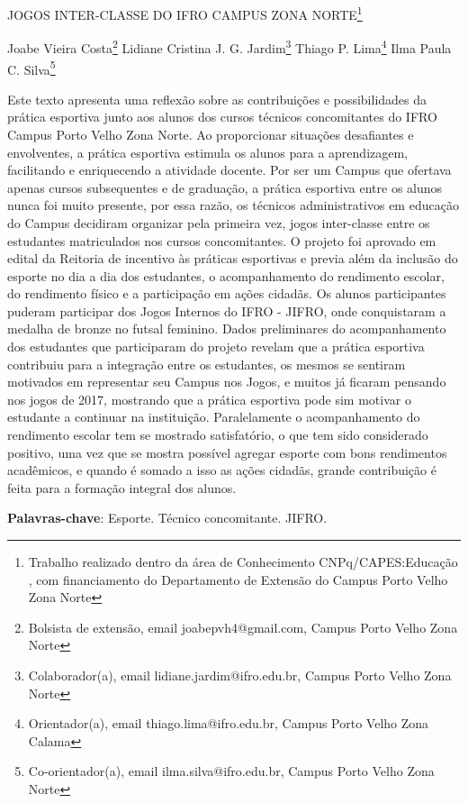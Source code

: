 \documentclass[article,12pt,onesidea,4paper,english,brazil]{abntex2}
\begin{document}
	
	
	\frenchspacing 
	
	\begin{center}
		\LARGE JOGOS INTER-CLASSE DO IFRO CAMPUS ZONA NORTE\footnote{Trabalho realizado dentro da área de Conhecimento CNPq/CAPES:Educação , com financiamento do Departamento de Extensão do Campus Porto Velho Zona Norte}
		
		\normalsize
		Joabe Vieira Costa\footnote{Bolsista de extensão, email joabepvh4@gmail.com, Campus Porto Velho Zona Norte} 
		Lidiane Cristina J. G. Jardim\footnote{Colaborador(a), email lidiane.jardim@ifro.edu.br, Campus Porto Velho Zona Norte} 
		Thiago P. Lima\footnote{Orientador(a), email thiago.lima@ifro.edu.br, Campus Porto Velho Zona Calama} 
		Ilma Paula C. Silva\footnote{Co-orientador(a), email ilma.silva@ifro.edu.br, Campus Porto Velho Zona Norte} 
	\end{center}
	
	\noindent Este texto apresenta uma reflexão sobre as contribuições e possibilidades da prática esportiva junto aos alunos dos cursos técnicos concomitantes do IFRO Campus Porto Velho Zona Norte. Ao proporcionar situações desafiantes e envolventes, a prática esportiva estimula os alunos para a aprendizagem, facilitando e enriquecendo a atividade docente. Por ser um Campus que ofertava apenas cursos subsequentes e de graduação, a prática esportiva entre os alunos nunca foi muito presente, por essa razão, os técnicos administrativos em educação do Campus decidiram organizar pela primeira vez, jogos inter-classe entre os estudantes matriculados nos cursos concomitantes. O projeto foi aprovado em edital da Reitoria de incentivo às práticas esportivas e previa além da inclusão do esporte no dia a dia dos estudantes, o acompanhamento do rendimento escolar, do rendimento físico e a participação em ações cidadãs. Os alunos participantes puderam participar dos Jogos Internos do IFRO - JIFRO, onde conquistaram a medalha de bronze no futsal feminino. Dados preliminares do acompanhamento dos estudantes que participaram do projeto revelam que a prática esportiva contribuiu para a integração entre os estudantes, os mesmos se sentiram motivados em representar seu Campus nos Jogos, e muitos já ficaram pensando nos jogos de 2017, mostrando que a prática esportiva pode sim motivar o estudante a continuar na instituição. Paralelamente o acompanhamento do rendimento escolar tem se mostrado satisfatório, o que tem sido considerado positivo, uma vez que se mostra possível agregar esporte com bons rendimentos acadêmicos, e quando é somado a isso as ações cidadãs, grande contribuição é feita para a formação integral dos alunos.
	
	\vspace{\onelineskip}
	
	\noindent
	\textbf{Palavras-chave}: Esporte. Técnico concomitante. JIFRO.
	
\end{document}
